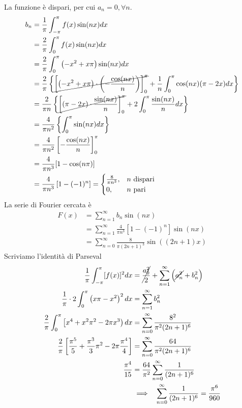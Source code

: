La funzione è dispari, per cui $a_{n} = 0, \forall n$.
\begin{align*}
b_{n} & = \frac{1}{\pi}\int^{\pi}_{- \pi} f(x)\sin(nx) dx\\
 & = \frac{2}{\pi}\int^{\pi}_{0} f(x)\sin(nx) dx\\
 & = \frac{2}{\pi}\int^{\pi}_{0}\left(- x^{2} + x\pi \right)\sin(nx) dx\\
 & = \frac{2}{\pi}\left\{\cancel{\left[\left(- x^{2} + x\pi \right) \cdot \left(- \frac{\cos(nx)}{n}\right)\right]^{\pi}_{0}} + \frac{1}{n}\int^{\pi}_{0}\cos(nx)(\pi - 2x) dx\right\}\\
 & = \frac{2}{\pi n}\left\{\cancel{\left[(\pi - 2x) \cdot \frac{\sin(nx)}{n}\right]^{\pi}_{0}} + 2\int^{\pi}_{0}\frac{\sin(nx)}{n} dx\right\}\\
 & = \frac{4}{\pi n^{2}}\left\{\int^{\pi}_{0}\sin(nx) dx\right\}\\
 & = \frac{4}{\pi n^{2}}\left[ - \frac{\cos(nx)}{n}\right]^{\pi}_{0}\\
 & = \frac{4}{\pi n^{3}}[ 1 - \cos(n\pi)]\\
 & = \frac{4}{\pi n^{3}}\left[ 1 - (- 1)^{n}\right] =
\begin{cases}
\frac{8}{\pi n^{3}}, & n\ \text{dispari}\\
0, & n\ \text{pari}
\end{cases}
\end{align*}
La serie di Fourier cercata è
\begin{align*}
F(x) & = \sum\limits^{\infty}_{n = 1} b_{n}\sin(nx)\\
 & = \sum\limits^{\infty}_{n = 1}\frac{4}{\pi n^{3}}\left[ 1 - (- 1)^{n}\right]\sin(nx)\\
 & = \sum\limits^{\infty}_{n = 0}\frac{8}{\pi (2n + 1)^{3}}\sin((2n + 1) x)
\end{align*}
Scriviamo l'identità di Parseval
\begin{align*}
\frac{1}{\pi}\int^{\pi}_{- \pi}[ f(x)]^{2} dx & = \cancel{\frac{a^{2}_{0}}{2}} + \sum\limits^{\infty}_{n = 1}\left(\cancel{a^{2}_{n}} + b^{2}_{n}\right)\\
\frac{1}{\pi} \cdot 2\int^{\pi}_{0}\left(x\pi - x^{2}\right)^{2} dx & = \sum\limits^{\infty}_{n = 1} b^{2}_{n}\\
\frac{2}{\pi}\int^{\pi}_{0}\left[ x^{4} + x^{2} \pi^{2} - 2\pi x^{3}\right) dx & = \sum\limits^{\infty}_{n = 0}\frac{8^{2}}{\pi^{2}(2n + 1)^{6}}\\
\frac{2}{\pi}\left[\frac{\pi^{5}}{5} + \frac{\pi^{3}}{3} \pi^{2} - 2\pi \frac{\pi^{4}}{4}\right] & = \sum\limits^{\infty}_{n = 0}\frac{64}{\pi^{2}(2n + 1)^{6}}\\
\frac{\pi^{4}}{15} & = \frac{64}{\pi^{2}}\sum\limits^{\infty}_{n = 0}\frac{1}{(2n + 1)^{6}}\\
 & \implies \ \ \sum\limits^{\infty}_{n = 0}\frac{1}{(2n + 1)^{6}} = \frac{\pi^{6}}{960}
\end{align*}
